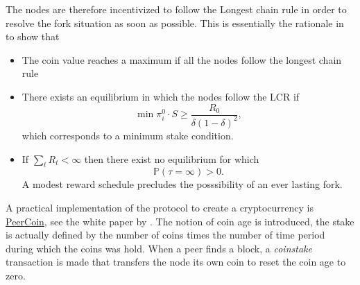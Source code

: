 \noindent The nodes are therefore incentivized to follow the Longest chain rule in order to resolve the fork situation as soon as possible. This is essentially the rationale in \citet{Saleh2020} to show that 
\begin{itemize}
    \item The coin value reaches a maximum if all the nodes follow the longest chain rule
    \item There exists an equilibrium in which the nodes follow the LCR if 
    $$
    \min \pi_i^0 \cdot S\geq\frac{R_0}{\delta(1-\delta)^2},
    $$
    which corresponds to a minimum stake condition.
    \item If $\sum_t R_t < \infty$ then there exist no equilibrium for which 
    $$
    \mathbb{P}(\tau=\infty)>0.
    $$
    A modest reward schedule precludes the posssibility of an ever lasting fork. 
\end{itemize}
A practical implementation of the \PoS protocol to create a cryptocurrency is \href{https://www.peercoin.net/}{PeerCoin}, see the white paper by \citet{ppcoin}. The notion of coin age is introduced, the stake is actually defined by the number of coins times the number of time period during which the coins was hold. When a peer finds a block, a \textit{coinstake} transaction is made that transfers the node its own coin to reset the coin age to zero.  
